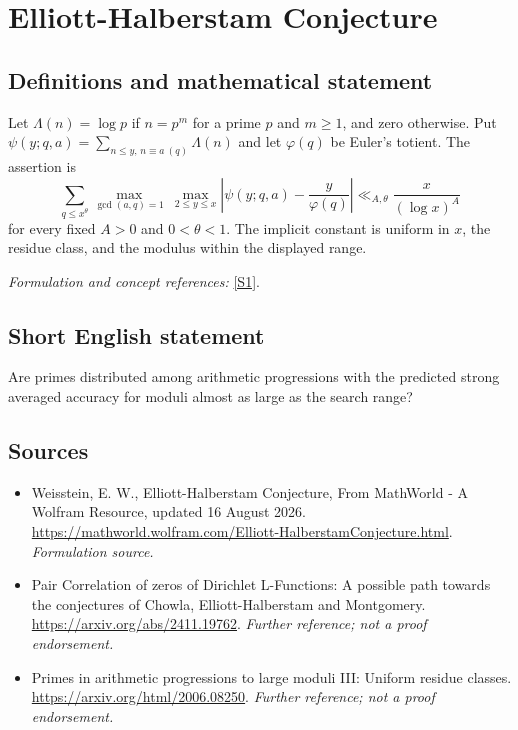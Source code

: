 \documentclass[11pt]{article}
\begin{document}
\section*{\texorpdfstring{Elliott-Halberstam Conjecture}{Elliott-Halberstam Conjecture}}\label{1296}
\subsection{Definitions and mathematical statement}
Let $\Lambda(n)=\log p$ if $n=p^m$ for a prime $p$ and $m\ge1$, and zero otherwise. Put $\psi(y;q,a)=\sum_{n\le y,\,n\equiv a\ (q)}\Lambda(n)$ and let $\varphi(q)$ be Euler's totient. The assertion is
\[
 \sum_{q\le x^\theta}\max_{\gcd(a,q)=1}\ \max_{2\le y\le x}
 \left|\psi(y;q,a)-\frac{y}{\varphi(q)}\right|
 \ll_{A,\theta}\frac{x}{(\log x)^A}
\]
for every fixed $A>0$ and $0<\theta<1$. The implicit constant is uniform in $x$, the residue class, and the modulus within the displayed range.
\par\smallskip\textit{Formulation and concept references:} \href{https://mathworld.wolfram.com/Elliott-HalberstamConjecture.html}{[S1]}.

\subsection{Short English statement}
Are primes distributed among arithmetic progressions with the predicted strong averaged accuracy for moduli almost as large as the search range?
\subsection{Sources}
\begin{itemize}
\item[S1]Weisstein, E. W., Elliott-Halberstam Conjecture, From MathWorld - A Wolfram Resource, updated 16 August 2026.
\url{https://mathworld.wolfram.com/Elliott-HalberstamConjecture.html}.
\textit{Formulation source.}
\item[S2]Pair Correlation of zeros of Dirichlet L-Functions: A possible path towards the conjectures of Chowla, Elliott-Halberstam and Montgomery.
\url{https://arxiv.org/abs/2411.19762}.
\textit{Further reference; not a proof endorsement.}
\item[S3]Primes in arithmetic progressions to large moduli III: Uniform residue classes.
\url{https://arxiv.org/html/2006.08250}.
\textit{Further reference; not a proof endorsement.}
\end{itemize}
\end{document}
